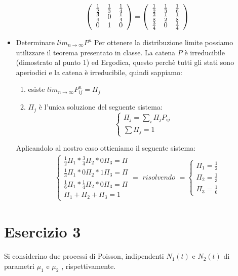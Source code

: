 \documentclass[a4paper]{article}
\begin{document}
\begin{itemize}
$$		\left(\begin{array}{c c c}{{\frac{1}{2}}}&{{\frac{1}{3}}}&{{\frac{1}{4}}}\\ {{\frac{3}{4}}}&{{0}}&{{\frac{1}{4}}}\\ {{0}}&{{1}}&{{0}}\end{array}\right)
		= \left(\begin{array}{c c c}{{\frac{1}{2}}}&{{\frac{1}{3}}}&{{\frac{1}{6}}}\\ {{\frac{3}{8}}}&{{\frac{1}{2}}}&{{\frac{1}{8}}}\\ {{\frac{3}{4}}}&{{0}}&{{\frac{1}{4}}}\end{array}\right) $$
	\item Determinare $lim_{n \rightarrow \infty}P^n$
		Per ottenere la distribuzione limite possiamo utilizzare il teorema presentato in classe. La catena $P$ è irreducibile (dimostrato al punto 1) ed Ergodica, questo perchè tutti gli stati sono aperiodici e la catena è irreducibile, quindi sappiamo:
		\begin{enumerate}
			\item esiste $lim_{n\rightarrow\infty}P^n_{ij}=\Pi_j$
			\item $\Pi_j$ è l'unica soluzione del seguente sistema: 
				\begin{equation*}
					\begin{cases} \Pi_j = \sum_i \Pi_j P_{ij}\\
						\sum \Pi_j = 1
					\end{cases}
				\end{equation*}
		\end{enumerate}
		Aplicandolo al nostro caso ottieniamo il seguente sistema:
		\begin{align*}
			\begin{cases}
				\frac{1}{2}\Pi_1 * \frac{3}{4}\Pi_2 * 0\Pi_3 = \Pi\\
				\frac{1}{3}\Pi_1 * 0\Pi_2 * 1\Pi_3 = \Pi\\
				\frac{1}{6}\Pi_1 * \frac{1}{4}\Pi_2 * 0\Pi_3 = \Pi\\
				\Pi_1 + \Pi_2 + \Pi_3 = 1
			\end{cases}
			= \textit{ risolvendo } = 
			\begin{cases}
				\Pi_1 = \frac{1}{2}\\
				\Pi_2 = \frac{1}{3}\\
				\Pi_3 = \frac{1}{6}
			\end{cases}
		\end{align*}
\end{itemize}
\section{Esercizio 3}
Si considerino due processi di Poisson, indipendenti $N_1(t)$ e $ N_2(t)$ di parametri $\mu_1$ e $\mu_2$ , rispettivamente.
\end{document}
